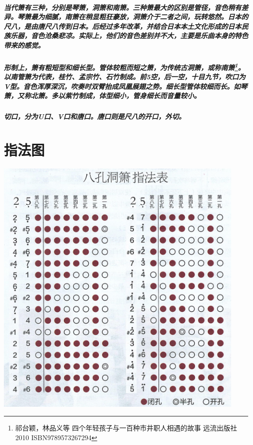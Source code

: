 \documentclass[cn,pad,twocol]{elegantbook}
\begin{document}
\paragraph*{当代箫有三种，分别是琴箫，洞箫和南箫。三种箫最大的区别是管径，音色稍有差异。琴箫最为细腻，南箫在稍显粗狂豪放，洞箫介于二者之间，玩转悠然。日本的尺八，是由唐尺八传到日本。后经过多年改革，并结合日本本土文化形成的日本民族乐器，音色沧桑悲凉。实际上，他们的音色差别并不大，主要是乐曲本身的特色带来的感觉。}
\paragraph*{形制上，箫有粗短型和细长型。管体较粗而短之箫，为传统古洞箫，或称南箫\footnote{祁台颖，林品义等 四个年轻孩子与一百种市井职人相遇的故事 远流出版社 2010 ISBN9789573267294}。以南管箫为代表，桂竹、孟宗竹、石竹制成。前5空，后一空，十目九节，吹口为V型。音色浑厚深沉，吹奏时双臂抬成凤凰展翅之势。细长型管体较细而长。如琴箫，又称北箫。多以紫竹制成，体型细小，管身细长而音量较小。}
\paragraph*{切口，分为U口、V口和唐口。唐口则是尺八的开口，外切。}
\chapter{指法图}
\includegraphics[width=0.93\textwidth]{dongxiao/Scan.jpeg}
\end{document}
